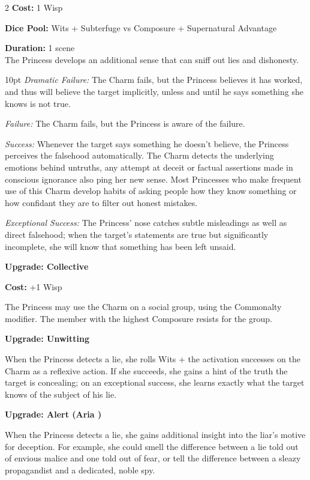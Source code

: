 \begin{multicols}{2}
\noindent \textbf{Cost:} 1 Wisp

\noindent \textbf{Dice Pool:}  Wits + Subterfuge vs Composure + Supernatural Advantage

\noindent \textbf{Duration:} 1 scene \\

\noindent The Princess develops an additional sense that can sniff out lies and dishonesty.

\begin{myindentpar}{10pt}    \emph{Dramatic Failure:} The Charm fails, but the Princess believes it has worked, and thus will believe the target implicitly, unless and until he says something she knows is not true.

    \emph{Failure:} The Charm fails, but the Princess is aware of the failure.

    \emph{Success:} Whenever the target says something he doesn't believe, the Princess perceives the falsehood automatically. The Charm detects the underlying emotions behind untruths, any attempt at deceit or factual assertions made in conscious ignorance also ping her new sense. Most Princesses who make frequent use of this Charm develop habits of asking people how they know something or how confidant they are to filter out honest mistakes. 

    \emph{Exceptional Success:} The Princess' nose catches subtle misleadings as well as direct falsehood; when the target's statements are true but significantly incomplete, she will know that something has been left unsaid.

\textbf{Upgrade: Collective}

\noindent \textbf{Cost:} +1 Wisp

The Princess may use the Charm on a social group, using the Commonalty modifier. The member with the highest Composure resists for the group.

\textbf{Upgrade: Unwitting}

When the Princess detects a lie, she rolls Wits + the activation successes on the Charm as a reflexive action. If she succeeds, she gains a hint of the truth the target is concealing; on an exceptional success, she learns exactly what the target knows of the subject of his lie.

\textbf{Upgrade: Alert (Aria \textbullet)}

When the Princess detects a lie, she gains additional insight into the liar's motive for deception. For example, she could smell the difference between a lie told out of envious malice and one told out of fear, or tell the difference between a sleazy propagandist and a dedicated, noble spy.


\end{myindentpar}
\end{multicols}
